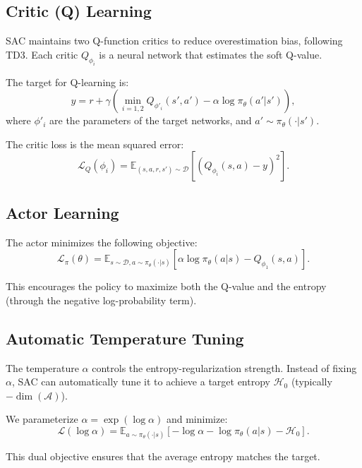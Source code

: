 \documentclass[conference]{IEEEtran}
\begin{document}
\subsection{Critic (Q) Learning}
SAC maintains two Q-function critics to reduce overestimation bias, following TD3. Each critic $Q_{\phi_i}$ is a neural network that estimates the soft Q-value.

The target for Q-learning is:
\begin{equation}
y = r + \gamma \left( \min_{i=1,2} Q_{\phi'_i}(s', a') - \alpha \log \pi_\theta(a'|s') \right),
\end{equation}
where $\phi'_i$ are the parameters of the target networks, and $a' \sim \pi_\theta(\cdot|s')$.

The critic loss is the mean squared error:
\begin{equation}
\mathcal{L}_Q(\phi_i) = \mathbb{E}_{(s,a,r,s') \sim \mathcal{D}} \left[ \left( Q_{\phi_i}(s,a) - y \right)^2 \right].
\end{equation}

\subsection{Actor Learning}
The actor minimizes the following objective:
\begin{equation}
\mathcal{L}_\pi(\theta) = \mathbb{E}_{s \sim \mathcal{D}, a \sim \pi_\theta(\cdot|s)} \left[ \alpha \log \pi_\theta(a|s) - Q_{\phi_1}(s,a) \right].
\end{equation}

This encourages the policy to maximize both the Q-value and the entropy (through the negative log-probability term).

\subsection{Automatic Temperature Tuning}
The temperature $\alpha$ controls the entropy-regularization strength. Instead of fixing $\alpha$, SAC can automatically tune it to achieve a target entropy $\mathcal{H}_0$ (typically $-\dim(\mathcal{A})$).

We parameterize $\alpha = \exp(\log \alpha)$ and minimize:
\begin{equation}
\mathcal{L}(\log \alpha) = \mathbb{E}_{a \sim \pi_\theta(\cdot|s)} \left[ -\log \alpha - \log \pi_\theta(a|s) - \mathcal{H}_0 \right].
\end{equation}

This dual objective ensures that the average entropy matches the target.
\end{document}
